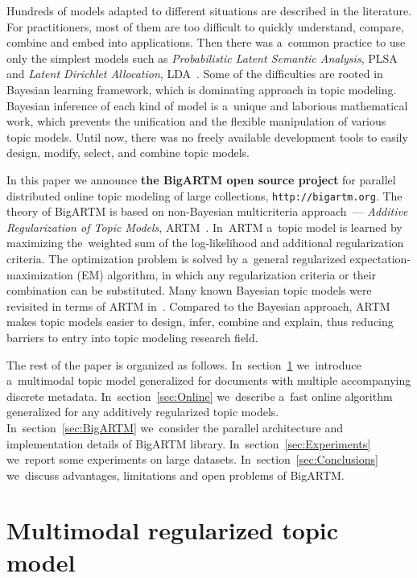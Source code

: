 \documentclass{llncs}
\begin{document}
Hundreds of models adapted to different situations are described in the literature.
For practitioners, most of them are too difficult to quickly
understand, compare, combine and embed into applications.
Then there was a~common practice to use only the simplest models such as
\emph{Probabilistic Latent Semantic Analysis}, PLSA~\cite{hofmann99plsi} and
\emph{Latent Dirichlet Allocation}, LDA~\cite{blei03latent}.
Some of the difficulties are rooted in Bayesian learning framework,
which is dominating approach in topic modeling.
Bayesian inference of each kind of model is a~unique and laborious mathematical work,
which prevents the unification and the flexible manipulation of various topic models.
Until now, there was no freely available development tools
to easily design, modify, select, and combine topic models.

In this paper we announce \textbf{the BigARTM open source project} for
parallel distributed online topic modeling of large collections,
\texttt{http://bigartm.org}.
The theory of BigARTM is based on non-Bayesian multicriteria approach~---
\emph{Additive Regularization of Topic Models}, ARTM~\cite{voron14dan-eng}.
In~ARTM a~topic model is learned by maximizing the~weighted sum
of the log-likelihood and additional regularization criteria.
The optimization problem is solved by a~general regularized expectation-maximization (EM) algorithm,
in which any regularization criteria or their combination can be substituted.
Many known Bayesian topic models were revisited in terms of ARTM in~\cite{voron14aist,voron14mlj}.
Compared to the Bayesian approach,
ARTM makes topic models easier to design, infer, combine and explain,
thus reducing barriers to entry into topic modeling research field.

The rest of the paper is organized as follows.
In~section~\ref{sec:Multimodal}
we~introduce a~multimodal topic model generalized for documents with multiple accompanying discrete metadata.
In~section~\ref{sec:Online}
we~describe a~fast online algorithm~\cite{hoffman10online} generalized for any additively regularized topic models.
In~section~\ref{sec:BigARTM}
we~consider the parallel architecture and implementation details of BigARTM library.
In~section~\ref{sec:Experiments}
we~report some experiments on large datasets.
In~section~\ref{sec:Conclusions}
we~discuss advantages, limitations and open problems of BigARTM.


\section{Multimodal regularized topic model}
\label{sec:Multimodal}
\end{document}
